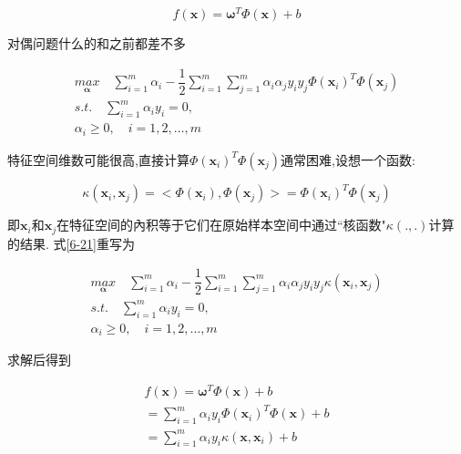 \documentclass[12pt]{article}
\numberwithin{equation}{section}%
\begin{document}
\begin{equation}
f(\boldsymbol{x})=\boldsymbol{\omega}^{T}\Phi(\boldsymbol{x})+b
\end{equation}

对偶问题什么的和之前都差不多

\begin{equation}
\begin{split} 
{\underset{\boldsymbol{\alpha}}{max}} \quad  \sum_{i=1}^{m}\alpha_{i}-\dfrac{1}{2}\sum_{i=1}^{m}\sum_{j=1}^{m}\alpha_{i}\alpha_{j}y_{i}y_{j}\Phi(\boldsymbol{x}_{i})^{T}\Phi(\boldsymbol{x}_{j})  \\
s.t. \quad \sum_{i=1}^{m}\alpha_{i}y_{i} = 0,  \\
\alpha_{i} \geqslant 0, \quad i=1,2, \ldots, m 
\end{split}
\label{6-21}
\end{equation}

特征空间维数可能很高,直接计算$\Phi(\boldsymbol{x}_{i})^{T}\Phi(\boldsymbol{x}_{j}) $通常困难,设想一个函数:

\begin{equation}
\kappa(\boldsymbol{x}_{i},\boldsymbol{x}_{j})=<\Phi(\boldsymbol{x}_{i}),\Phi(\boldsymbol{x}_{j}) >=\Phi(\boldsymbol{x}_{i})^{T}\Phi(\boldsymbol{x}_{j}) 
\end{equation}

即$\boldsymbol{x}_{i}$和$\boldsymbol{x}_{j}$在特征空间的內积等于它们在原始样本空间中通过``核函数"$\kappa(.,.)$计算的结果. 式\ref{6-21}重写为

\begin{equation}
\begin{split} 
{\underset{\boldsymbol{\alpha}}{max}} \quad  \sum_{i=1}^{m}\alpha_{i}-\dfrac{1}{2}\sum_{i=1}^{m}\sum_{j=1}^{m}\alpha_{i}\alpha_{j}y_{i}y_{j}\kappa(\boldsymbol{x}_{i},\boldsymbol{x}_{j})  \\
s.t. \quad \sum_{i=1}^{m}\alpha_{i}y_{i} = 0,  \\
\alpha_{i} \geqslant 0, \quad i=1,2, \ldots, m 
\end{split}
\label{6-23}
\end{equation}

求解后得到

\begin{equation}
\begin{split} 
f(\boldsymbol{x})=\boldsymbol{\omega}^{T}\Phi(\boldsymbol{x})+b \\
= \sum_{i=1}^{m}\alpha_{i}y_{i}\Phi(\boldsymbol{x}_{i})^{T}\Phi(\boldsymbol{x})+b  \\
=\sum_{i=1}^{m}\alpha_{i}y_{i}\kappa(\boldsymbol{x},\boldsymbol{x}_{i})+b
\end{split} 
\label{6-24}
\end{equation}
\end{document}
